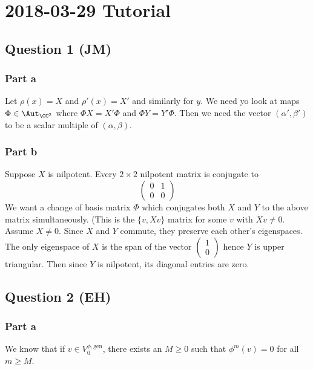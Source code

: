 \section{2018-03-29 Tutorial}

\subsection*{Question 1 (JM)}

\subsubsection*{Part a}
Let $\rho(x)=X$ and $\rho'(x)=X'$ and similarly for $y$.
We need yo look at maps $\Phi \in \Aut_{\CC^2}$ where $\Phi X = X'\Phi$ and $\Phi Y = Y'\Phi$.
Then we need the vector $(\alpha',\beta')$ to be a scalar multiple of $(\alpha,\beta)$.

\subsubsection*{Part b}
Suppose $X$ is nilpotent.
Every $2 \times 2$ nilpotent matrix is conjugate to
\[
	\begin{pmatrix}
    	0 & 1 \\
        0 & 0
    \end{pmatrix}
\]
We want a change of basis matrix $\Phi$ which conjugates both $X$ and $Y$ to the above matrix simultaneously.
(This is the $\{v,Xv\}$ matrix for some $v$ with $Xv \neq 0$.
Assume $X \neq 0$.
Since $X$ and $Y$ commute, they preserve each other's eigenspaces.
The only eigenspace of $X$ is the span of the vector
\(
	\left(
	\begin{smallmatrix}
		1 \\ 0
	\end{smallmatrix}
    \right)
\)
hence $Y$ is upper triangular.
Then since $Y$ is nilpotent, its diagonal entries are zero.

\subsection*{Question 2 (EH)}

\subsubsection*{Part a}

We know that if $v \in V_0^{\phi,\text{gen}}$, there exists an $M \geq 0$ such that $\phi^m(v)=0$ for all $m \geq M$.


